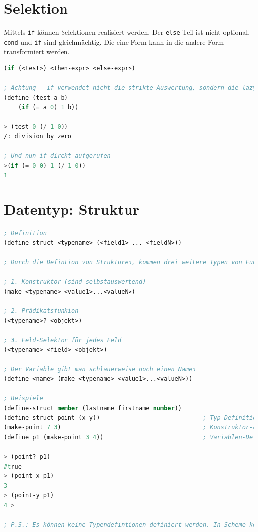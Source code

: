 \newpage
\section{Selektion}
Mittels \verb|if| können Selektionen realisiert werden. Der \verb|else|-Teil ist nicht optional. \verb|cond| und \verb|if| sind gleichmächtig. Die eine Form kann in die andere Form transformiert werden.

\begin{lstlisting}[language=Lisp, caption=Selektion]
(if (<test>) <then-expr> <else-expr>)

; Achtung - if verwendet nicht die strikte Auswertung, sondern die lazy evaluation.
(define (test a b)
	(if (= a 0) 1 b))
	
> (test 0 (/ 1 0))
/: division by zero	

; Und nun if direkt aufgerufen
>(if (= 0 0) 1 (/ 1 0))
1
\end{lstlisting}

\section{Datentyp: Struktur}

\begin{lstlisting}[language=Lisp, caption=Strukturen]
; Definition
(define-struct <typename> (<field1> ... <fieldN>))

; Durch die Defintion von Strukturen, kommen drei weitere Typen von Funktionen mit:

; 1. Konstruktor (sind selbstauswertend)
(make-<typename> <value1>...<valueN>)

; 2. Prädikatsfunkion
(<typename>? <objekt>)

; 3. Feld-Selektor für jedes Feld
(<typename>-<field> <objekt>)

; Der Variable gibt man schlauerweise noch einen Namen
(define <name> (make-<typename> <value1>...<valueN>))

; Beispiele
(define-struct member (lastname firstname number))
(define-struct point (x y)) 							; Typ-Definition
(make-point 7 3) 										; Konstruktor-Aufruf
(define p1 (make-point 3 4)) 							; Variablen-Definition

> (point? p1)
#true
> (point-x p1)
3
> (point-y p1)
4 >

; P.S.: Es können keine Typendefintionen definiert werden. In Scheme kommentiert man die Datentypen in den Strukturen. Scheme hat einen vordefinierte Struktur für den Punkt: posn (x y).
\end{lstlisting}

